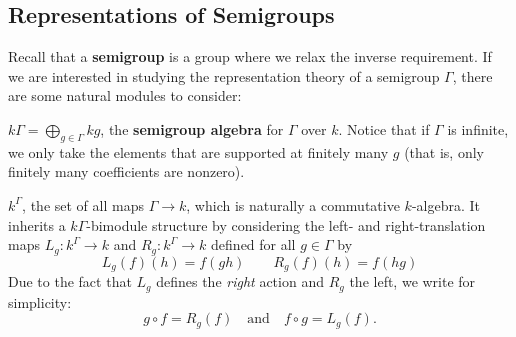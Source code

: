 \documentclass[12pt]{article}
\DeclareMathOperator{\1}{\mathbbm{1}}
\begin{document}
\subsection{Representations of Semigroups}
Recall that a \textbf{semigroup} is a group where we relax the inverse requirement. If we are interested in studying the representation 
theory of a semigroup $\Gamma$, there are some natural modules to consider:
\begin{ex}
	$k\Gamma=\bigoplus_{g\in \Gamma}kg$, the \textbf{semigroup algebra} for $\Gamma$ over $k$. Notice that if $\Gamma$ is infinite, we only take 
	the elements that are supported at finitely many $g$ (that is, only finitely many coefficients are nonzero).
\end{ex}
\begin{ex} $k^\Gamma$, the set of all maps $\Gamma\to k$, which is naturally a commutative $k$-algebra. It inherits a $k\Gamma$-bimodule structure 
	by considering the left- and right-translation maps $L_g:k^\Gamma\to k$ and $R_g:k^\Gamma\to k$ defined for all $g\in\Gamma$ by 
	\[L_g(f)(h)= f(gh)\qquad R_g(f)(h)=f(hg)\]
	Due to the fact that $L_g$ defines the \textit{right} action and $R_g$ the left, we write for simplicity:
	\[g\circ f=R_g(f)\quad\text{and}\quad f\circ g=L_g(f).\]
\end{ex}
\end{document}
